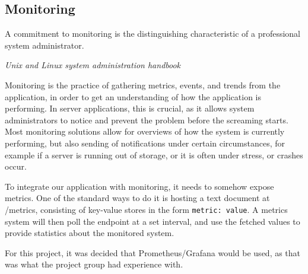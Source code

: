 \subsection{Monitoring}
\epigraph{A commitment to monitoring is the distinguishing characteristic of a professional system administrator.}{\textit{Unix and Linux system administration handbook}}

Monitoring is the practice of gathering metrics, events, and trends from the application, in order to get an understanding of how the application is performing.
In server applications, this is crucial, as it allows system administrators to notice and prevent the problem before the screaming starts.
Most monitoring solutions allow for overviews of how the system is currently performing, but also sending of notifications under certain circumstances, for example if a server is running out of storage, or it is often under stress, or crashes occur.

To integrate our application with monitoring, it needs to somehow expose metrics.
One of the standard ways to do it is hosting a text document at /metrics, consisting of key-value stores in the form \texttt{metric: value}.
A metrics system will then poll the endpoint at a set interval, and use the fetched values to provide statistics about the monitored system.

For this project, it was decided that Prometheus/Grafana would be used, as that was what the project group had experience with.

